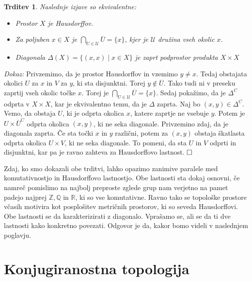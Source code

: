 \documentclass[a4paper,12pt]{article}
\def\Z{\mathbb{Z}} %
\def\Q{\mathbb{Q}} %
\def\R{\mathbb{R}} %
\def\qed{$\hfill\Box$}   %
\newtheorem{trditev}{Trditev}
\begin{document}
\begin{trditev}
    Naslednje izjave so ekvivalentne:
    \begin{itemize}
        \item[\rm (i)] Prostor $X$ je Hausdorffov.
        \item[\rm (ii)] Za poljuben $x \in X$ je $\bigcap_{U \in \mathcal{U}} \overline{U} = \{x\}$, kjer je $\mathcal{U}$ družina vseh okolic $x$.
        \item[\rm (iii)] Diagonala $\Delta(X) = \{(x,x) \mid x \in X \} $ je zaprt podprostor produkta $X \times X$
    \end{itemize}
\end{trditev}

\noindent
{\em Dokaz:\/}
    Privzemimo, da je prostor Hausdorffov in vzemimo $y \neq x$. Tedaj obstajata okolici $U$ za $x$ in $V$ za $y$, ki sta disjunktni. Torej $y \notin \overline{U}$.
    Tako tudi ni v preseku zaprtij vseh okolic točke $x$. Torej je $\bigcap_{U \in \mathcal{U}} \overline{U} = \{x\}$.
    Sedaj pokažimo, da je $\Delta^C$ odprta v $X \times X$, kar je ekvivalentno temu, da je $\Delta$ zaprta.
    Naj bo $(x,y) \in \Delta^C$. Vemo, da obstaja $U$, ki je odprta okolica $x$, katere zaprtje ne vsebuje $y$.
    Potem je $U \times \overline{U}^C$ odprta okolica $(x,y)$, ki ne seka diagonale.
    Privzemino zdaj, da je diagonala zaprta. Če sta točki $x$ in $y$ različni, potem za $(x,y)$ obstaja škatlasta odprta okolica $U \times V$, ki ne seka diagonale.
    To pomeni, da sta $U$ in $V$ odprti in disjunktni, kar pa je ravno zahteva za Hausdorffovo lastnost. \qed



Zdaj, ko smo dokazali obe trditvi, lahko opazimo zanimive paralele med komutativnostjo in Hausdorffovo lastnostjo. Obe lastnosti sta dokaj osnovni,
če namreč pomislimo na najbolj preproste zglede grup nam verjetno na pamet padejo najprej $\Z, \Q$ in $\R$, ki so vse komutativne.
Ravno tako se topološke prostore včasih motivira kot posplošitev metričnih prostorov, ki so seveda Hausdorffovi.
Obe lastnosti se da karakterizirati z diagonalo.
Vprašamo se, ali se da ti dve lastnosti kako konkretno povezati. Odgovor je da, kakor bomo videli v naslednjem poglavju.





\section{Konjugiranostna topologija}
\end{document}
